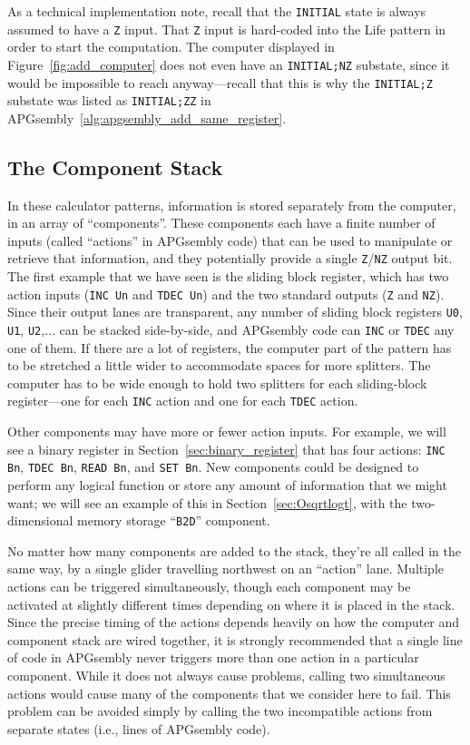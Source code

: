 As a technical implementation note, recall that the \texttt{INITIAL} state is always assumed to have a \texttt{Z} input. That \texttt{Z} input is hard-coded into the Life pattern in order to start the computation. The computer displayed in Figure~\ref{fig:add_computer} does not even have an \texttt{INITIAL;NZ} substate, since it would be impossible to reach anyway---recall that this is why the \texttt{INITIAL;Z} substate was listed as \texttt{INITIAL;ZZ} in APGsembly~\ref{alg:apgsembly_add_same_register}.


\subsection{The Component Stack}

In these calculator patterns, information is stored separately from the computer, in an array of ``components''. These components each have a finite number of inputs (called ``actions'' in APGsembly code) that can be used to manipulate or retrieve that information, and they potentially provide a single \texttt{Z}/\texttt{NZ} output bit. The first example that we have seen is the sliding block register, which has two action inputs (\texttt{INC Un} and \texttt{TDEC Un}) and the two standard outputs (\texttt{Z} and \texttt{NZ}). Since their output lanes are transparent, any number of sliding block registers \texttt{U0}, \texttt{U1}, \texttt{U2},$\ldots$ can be stacked side-by-side, and APGsembly code can \texttt{INC} or \texttt{TDEC} any one of them. If there are a lot of registers, the computer part of the pattern has to be stretched a little wider to accommodate spaces for more splitters. The computer has to be wide enough to hold two splitters for each sliding-block register---one for each \texttt{INC} action and one for each \texttt{TDEC} action.

Other components may have more or fewer action inputs. For example, we will see a binary register in Section~\ref{sec:binary_register} that has four actions: \texttt{INC Bn}, \texttt{TDEC Bn}, \texttt{READ Bn}, and \texttt{SET Bn}. New components could be designed to perform any logical function or store any amount of information that we might want; we will see an example of this in Section~\ref{sec:Osqrtlogt}, with the two-dimensional memory storage ``\texttt{B2D}'' component.

No matter how many components are added to the stack, they're all called in the same way, by a single glider travelling northwest on an ``action'' lane. Multiple actions can be triggered simultaneously, though each component may be activated at slightly different times depending on where it is placed in the stack. Since the precise timing of the actions depends heavily on how the computer and component stack are wired together, it is strongly recommended that a single line of code in APGsembly never triggers more than one action in a particular component. While it does not always cause problems, calling two simultaneous actions would cause many of the components that we consider here to fail. This problem can be avoided simply by calling the two incompatible actions from separate states (i.e., lines of APGsembly code).


